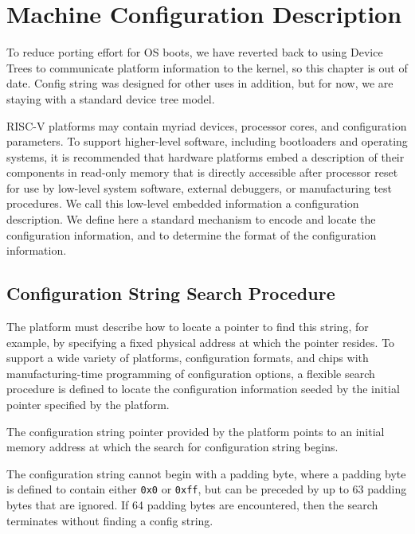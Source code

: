 \chapter{Machine Configuration Description}
\label{cfgstr}

\begin{commentary}
  To reduce porting effort for OS boots, we have reverted back to
  using Device Trees to communicate platform information to the
  kernel, so this chapter is out of date.  Config string was designed
  for other uses in addition, but for now, we are staying with a
  standard device tree model.
 \end{commentary}

RISC-V platforms may contain myriad devices, processor cores, and
configuration parameters.  To support higher-level software, including
bootloaders and operating systems, it is recommended that hardware
platforms embed a description of their components in read-only memory
that is directly accessible after processor reset for use by low-level
system software, external debuggers, or manufacturing test procedures.
We call this low-level embedded information a configuration
description.  We define here a standard mechanism to encode and locate
the configuration information, and to determine the format of the
configuration information.

\section{Configuration String Search Procedure}

The platform must describe how to locate a pointer to find this
string, for example, by specifying a fixed physical address at which
the pointer resides.  To support a wide variety of platforms,
configuration formats, and chips with manufacturing-time programming
of configuration options, a flexible search procedure is defined to
locate the configuration information seeded by the initial pointer
specified by the platform.

The configuration string pointer provided by the platform points to an
initial memory address at which the search for configuration string
begins.

The configuration string cannot begin with a padding byte, where a
padding byte is defined to contain either {\tt 0x0} or {\tt 0xff}, but
can be preceded by up to 63 padding bytes that are ignored.  If 64
padding bytes are encountered, then the search terminates without
finding a config string.

